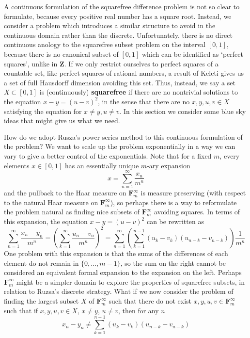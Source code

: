 \documentclass{report}
\theoremstyle{plain}
\theoremstyle{plain}
\begin{document}
A continuous formulation of the squarefree difference problem is not so clear to formulate, because every positive real number has a square root. Instead, we consider a problem which introduces a similar structure to avoid in the continuous domain rather than the discrete. Unfortunately, there is no direct continuous anology to the squarefree subset problem on the interval $[0,1]$, because there is no canonical subset of $[0,1]$ which can be identified as `perfect squares', unlike in $\mathbf{Z}$. If we only restrict ourselves to perfect squares of a countable set, like perfect squares of rational numbers, a result of Keleti gives us a set of full Hausdorff dimension avoiding this set. Thus, instead, we say a set $X \subset [0,1]$ is (continuously) {\bf squarefree} if there are no nontrivial solutions to the equation $x - y = (u - v)^2$, in the sense that there are no $x,y,u,v \in X$ satisfying the equation for $x \neq y, u \neq v$. In this section we consider some blue sky ideas that might give us what we need.

How do we adopt Rusza's power series method to this continuous formulation of the problem? We want to scale up the problem exponentially in a way we can vary to give a better control of the exponentials. Note that for a fixed $m$, every elements $x \in [0,1]$ has an essentially unique $m$-ary expansion
%
\[ x = \sum_{n = 1}^\infty \frac{x_n}{m^n} \]
%
and the pullback to the Haar measure on $\mathbf{F}_m^\infty$ is measure preserving (with respect to the natural Haar measure on $\mathbf{F}_m^\infty$), so perhaps there is a way to reformulate the problem natural as finding nice subsets of $\mathbf{F}_m^\infty$ avoiding squares. In terms of this expansion, the equation $x - y = (u - v)^2$ can be rewritten as
%
\[ \sum_{n = 1}^\infty \frac{x_n - y_n}{m^n} = \left( \sum_{k = 1}^\infty \frac{u_n - v_n}{m^n} \right)^2 = \sum_{n = 1}^\infty \left( \sum_{k = 1}^{n-1} (u_k - v_k)(u_{n-k} - v_{n-k}) \right) \frac{1}{m^n} \]
%
One problem with this expansion is that the sums of the differences of each element do not remain in $\{ 0, \dots, m-1 \}$, so the sum on the right cannot be considered an equivalent formal expansion to the expansion on the left. Perhaps $\mathbf{F}_m^\infty$ might be a simpler domain to explore the properties of squarefree subsets, in relation to Ruzsa's discrete strategy. What if we now consider the problem of finding the largest subset $X$ of $\mathbf{F}_m^\infty$ such that there do not exist $x,y,u,v \in \mathbf{F}_m^\infty$ such that if $x,y,u,v \in X$, $x \neq y$, $u \neq v$, then for any $n$
%
\[ x_n - y_n \neq \sum_{k = 1}^{n-1} (u_k - v_k)(u_{n-k} - v_{n-k}) \]
\end{document}
